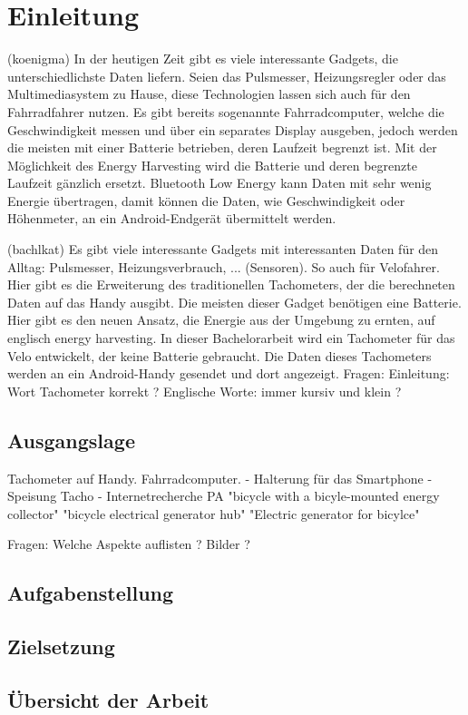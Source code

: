 \chapter{Einleitung}
(koenigma)
In der heutigen Zeit gibt es viele interessante Gadgets, die unterschiedlichste Daten liefern. Seien das Pulsmesser, Heizungsregler oder das Multimediasystem zu Hause, diese Technologien lassen sich auch für den Fahrradfahrer nutzen. Es gibt bereits sogenannte Fahrradcomputer, welche die Geschwindigkeit messen und über ein separates Display ausgeben, jedoch werden die meisten mit einer Batterie betrieben, deren Laufzeit begrenzt ist. Mit der Möglichkeit des Energy Harvesting wird die Batterie und deren begrenzte Laufzeit gänzlich ersetzt. Bluetooth Low Energy kann Daten mit sehr wenig Energie übertragen, damit können die Daten, wie Geschwindigkeit oder Höhenmeter, an ein Android-Endgerät übermittelt werden.

(bachlkat)
Es gibt viele interessante Gadgets mit interessanten Daten für den Alltag: Pulsmesser, Heizungsverbrauch, ... (Sensoren). So auch für Velofahrer. Hier gibt es die Erweiterung des traditionellen Tachometers, der die berechneten Daten auf das Handy ausgibt. 
Die meisten dieser Gadget benötigen eine Batterie. Hier gibt es den neuen Ansatz, die Energie aus der Umgebung zu ernten, auf englisch energy harvesting. In dieser Bachelorarbeit wird ein Tachometer für das Velo entwickelt, der keine Batterie gebraucht. Die Daten dieses Tachometers werden an ein Android-Handy gesendet und dort angezeigt.
Fragen:
Einleitung: Wort Tachometer korrekt ?
Englische Worte: immer kursiv und klein ?

\section{Ausgangslage}
Tachometer auf Handy.
Fahrradcomputer.
- Halterung für das Smartphone
- Speisung Tacho
- Internetrecherche PA \cite{PA_bicycle} 
   "bicycle with a bicyle-mounted energy collector"
   "bicycle electrical generator hub"
   "Electric generator for bicylce"

Fragen:
Welche Aspekte auflisten ?  
Bilder ?

\section{Aufgabenstellung}



\section{Zielsetzung}





\section{Übersicht der Arbeit}
